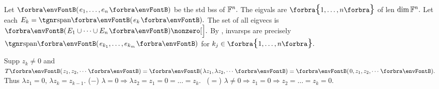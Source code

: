 %

Let $\Par{e_1,\dots,e_n}$ be the std bss of ${\mathbb{F}}^n.$ The eigvals are $\Bra{1,\dots,n}$ of len $\dim{\mathbb{F}}^n.$\parSol{}
Let each $E_k=\Span{e_k}.$ The set of all eigvecs is $\Par{E_1\cup\cdots\cup E_n}\nonzero[\Big].$\parSol{}
By {}, invarsps are precisely  $\Span{e_{k_1},\dots,e_{k_m}}$ for $k_j\in\Bra{1,\dots,n}.$\PfEnd
\SepLine

Supp $z_k\neq 0$ and $T\Par{z_1,z_2,\cdots}=\Par{\lambda z_1,\lambda z_2,\cdots}=\Par{0,z_1,z_2,\cdots}.$ Thus $\lambda z_1=0,\,\lambda z_k=z_{k-1}.$\parSol{}
($-$) $\lambda=0\Rightarrow\lambda z_2=z_1=0=\dots=z_k.$ \, ($=$) $\lambda\neq 0\Rightarrow z_1=0\Rightarrow z_2=\dots=z_k=0.$\PfEnd
\SepLine

